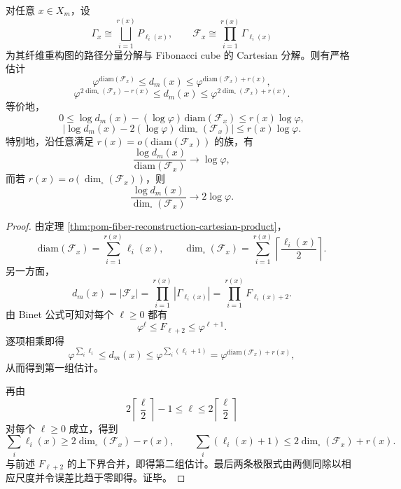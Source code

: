 \begin{theorem}[纤维多重度的直径熵刚性与立方维二倍黄金斜率]\label{thm:conclusion-fiber-multiplicity-diameter-cubedim-rigidity}
对任意 \(x\in X_m\)，设
\[
\Gamma_x\cong\bigsqcup_{i=1}^{r(x)}P_{\ell_i(x)},
\qquad
\mathcal F_x\cong \prod_{i=1}^{r(x)}\Gamma_{\ell_i(x)}
\]
为其纤维重构图的路径分量分解与 Fibonacci cube 的 Cartesian 分解。则有严格估计
\[
\varphi^{\mathrm{diam}(\mathcal F_x)}
\le d_m(x)\le
\varphi^{\mathrm{diam}(\mathcal F_x)+r(x)},
\]
\[
\varphi^{2\dim_\square(\mathcal F_x)-r(x)}
\le d_m(x)\le
\varphi^{2\dim_\square(\mathcal F_x)+r(x)}.
\]
等价地，
\[
0\le
\log d_m(x)-(\log\varphi)\,\mathrm{diam}(\mathcal F_x)
\le r(x)\log\varphi,
\]
\[
\bigl|
\log d_m(x)-2(\log\varphi)\dim_\square(\mathcal F_x)
\bigr|
\le r(x)\log\varphi.
\]
特别地，沿任意满足 \(r(x)=o(\mathrm{diam}(\mathcal F_x))\) 的族，有
\[
\frac{\log d_m(x)}{\mathrm{diam}(\mathcal F_x)}\longrightarrow \log\varphi,
\]
而若 \(r(x)=o(\dim_\square(\mathcal F_x))\)，则
\[
\frac{\log d_m(x)}{\dim_\square(\mathcal F_x)}\longrightarrow 2\log\varphi.
\]
\end{theorem}
\begin{proof}
由定理 \ref{thm:pom-fiber-reconstruction-cartesian-product}，
\[
\mathrm{diam}(\mathcal F_x)=\sum_{i=1}^{r(x)}\ell_i(x),
\qquad
\dim_\square(\mathcal F_x)=\sum_{i=1}^{r(x)}\left\lceil\frac{\ell_i(x)}{2}\right\rceil.
\]
另一方面，
\[
d_m(x)=|\mathcal F_x|=\prod_{i=1}^{r(x)}|\Gamma_{\ell_i(x)}|
=\prod_{i=1}^{r(x)}F_{\ell_i(x)+2}.
\]
由 Binet 公式可知对每个 \(\ell\ge 0\) 都有
\[
\varphi^\ell\le F_{\ell+2}\le \varphi^{\ell+1}.
\]
逐项相乘即得
\[
\varphi^{\sum_i\ell_i}\le d_m(x)\le \varphi^{\sum_i(\ell_i+1)}
=\varphi^{\mathrm{diam}(\mathcal F_x)+r(x)},
\]
从而得到第一组估计。

再由
\[
2\left\lceil\frac{\ell}{2}\right\rceil-1\le \ell\le 2\left\lceil\frac{\ell}{2}\right\rceil
\]
对每个 \(\ell\ge 0\) 成立，得到
\[
\sum_i \ell_i(x)\ge 2\dim_\square(\mathcal F_x)-r(x),
\qquad
\sum_i (\ell_i(x)+1)\le 2\dim_\square(\mathcal F_x)+r(x).
\]
与前述 \(F_{\ell+2}\) 的上下界合并，即得第二组估计。最后两条极限式由两侧同除以相应尺度并令误差比趋于零即得。证毕。
\end{proof}

